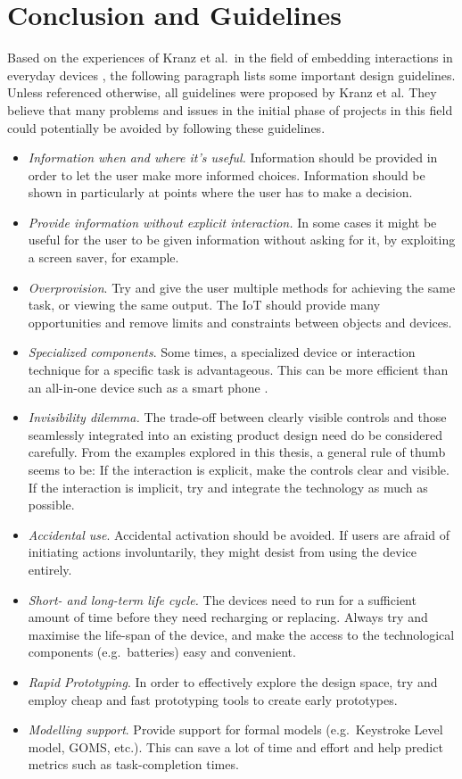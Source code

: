 \section{Conclusion and Guidelines}
\label{sec:conclusion}
Based on the experiences of Kranz et al.\ in the field of embedding interactions in everyday devices \cite{kranz10}, the following paragraph lists some important design guidelines.
Unless referenced otherwise, all guidelines were proposed by Kranz et al.
They believe that many problems and issues in the initial phase of projects in this field could potentially be avoided by following these guidelines.
\begin{itemize}
	\item \emph{Information when and where it's useful.} Information should be provided in order to let the user make more informed choices. Information should be shown in particularly at points where the user has to make a decision.
	\item \emph{Provide information without explicit interaction.} In some cases it might be useful for the user to be given information without asking for it, by exploiting a screen saver, for example.
	\item \emph{Overprovision}. Try and give the user multiple methods for achieving the same task, or viewing the same output. The IoT should provide many opportunities and remove limits and constraints between objects and devices.
	\item \emph{Specialized components}. Some times, a specialized device or interaction technique for a specific task is advantageous. This can be more efficient than an all-in-one device such as a smart phone \cite{corsten13,kranz10}.
	\item \emph{Invisibility dilemma.} The trade-off between clearly visible controls and those seamlessly integrated into an existing product design need do be considered carefully. From the examples explored in this thesis, a general rule of thumb seems to be: If the interaction is explicit, make the controls clear and visible. If the interaction is implicit, try and integrate the technology as much as possible.
	\item \emph{Accidental use}. Accidental activation should be avoided. If users are afraid of initiating actions involuntarily, they might desist from using the device entirely.
	\item \emph{Short- and long-term life cycle.} The devices need to run for a sufficient amount of time before they need recharging or replacing. Always try and maximise the life-span of the device, and make the access to the technological components (e.g.\ batteries) easy and convenient.
	\item \emph{Rapid Prototyping}. In order to effectively explore the design space, try and employ cheap and fast prototyping tools to create early prototypes.
	\item \emph{Modelling support}. Provide support for formal models (e.g.\ Keystroke Level model, GOMS, etc.). This can save a lot of time and effort and help predict metrics such as task-completion times.
\end{itemize}

